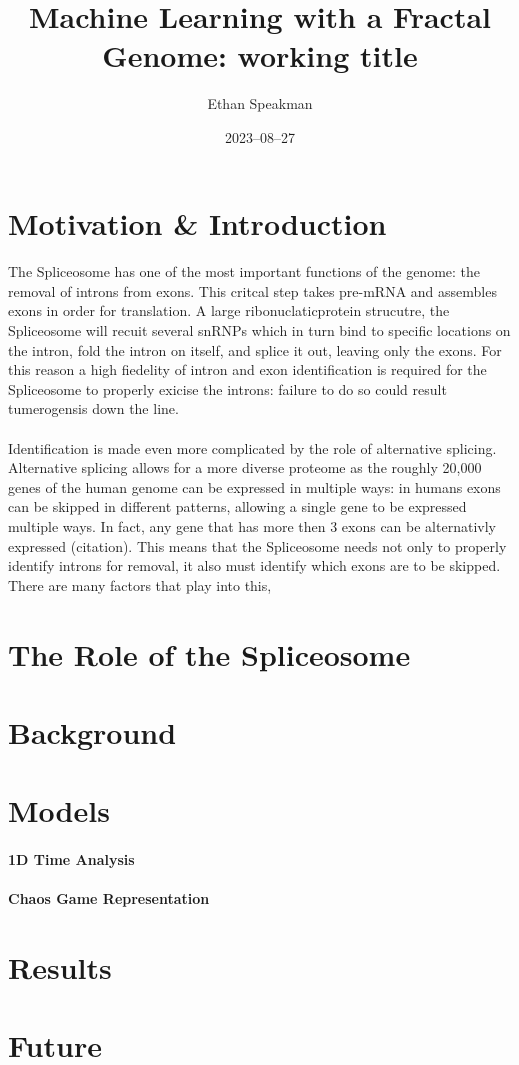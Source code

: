 \documentclass[12pt]{article}
\title{Machine Learning with a Fractal Genome: working title}
\author{Ethan Speakman}
\date{2023–08–27}
\begin{document}
\maketitle

\section{Motivation & Introduction}
\paragraph*{}
The Spliceosome has one of the most important functions of the genome: the removal of introns from exons. 
This critcal step takes pre-mRNA and assembles exons in order for translation. 
A large ribonuclaticprotein strucutre, the Spliceosome will recuit several snRNPs which in turn bind to specific locations on the intron, fold the intron on itself, and splice it out, leaving only the exons\cite{SpliceStrucFunc}\cite[]{DayintheLife}.
For this reason a high fiedelity of intron and exon identification is required for the Spliceosome to properly exicise the introns: failure to do so could result tumerogensis down the line.
\paragraph*{}
Identification is made even more complicated by the role of alternative splicing.
Alternative splicing allows for a more diverse proteome as the roughly 20,000 genes of the human genome can be expressed in multiple ways: in humans exons can be skipped in different patterns, allowing a single gene to be expressed multiple ways.
In fact, any gene that has more then 3 exons can be alternativly expressed (citation).
This means that the Spliceosome needs not only to properly identify introns for removal, it also must identify which exons are to be skipped.
There are many factors that play into this,
\section{The Role of the Spliceosome}

\section{Background}
\section{Models}
\paragraph*{1D Time Analysis}
\paragraph*{Chaos Game Representation}

\section{Results}

\section{Future}
\end{document}
